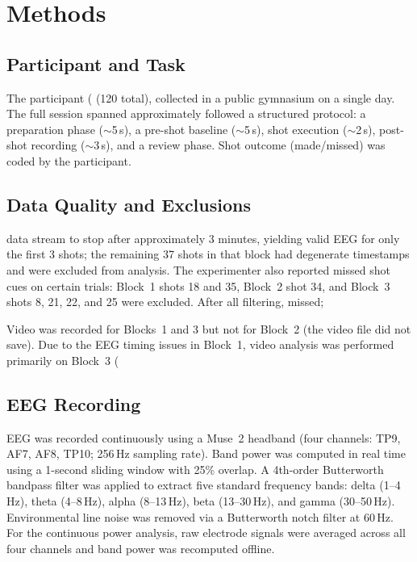 \documentclass[11pt,a4paper]{article}
\begin{document}
\section{Methods}

\subsection{Participant and Task}
The participant (%
(120 total), collected in a public gymnasium on a single day. The full session
spanned approximately %
followed a structured protocol: a preparation phase ($\sim$5\,s), a pre-shot
baseline ($\sim$5\,s), shot execution ($\sim$2\,s), post-shot recording
($\sim$3\,s), and a review phase. Shot outcome (made/missed) was coded by the
participant.

\subsection{Data Quality and Exclusions}
data stream to stop after approximately 3 minutes, yielding valid EEG for only
the first 3 shots; the remaining 37 shots in that block had degenerate
timestamps and were excluded from analysis. The experimenter also reported
missed shot cues on certain trials: Block~1 shots 18 and 35, Block~2 shot 34,
and Block~3 shots 8, 21, 22, and 25 were excluded. After all filtering,
missed; %

Video was recorded for Blocks~1 and 3 but not for Block~2 (the video file did
not save). Due to the EEG timing issues in Block~1, video analysis was
performed primarily on Block~3 (%

\subsection{EEG Recording}
EEG was recorded continuously using a Muse~2 headband (four channels: TP9,
AF7, AF8, TP10; 256\,Hz sampling rate). Band power was computed in real time
using a 1-second sliding window with 25\% overlap. A 4th-order Butterworth
bandpass filter was applied to extract five standard frequency bands: delta
(1--4\,Hz), theta (4--8\,Hz), alpha (8--13\,Hz), beta (13--30\,Hz), and gamma
(30--50\,Hz). Environmental line noise was removed via a Butterworth notch
filter at 60\,Hz. For the continuous power analysis, raw electrode signals were
averaged across all four channels and band power was recomputed offline.
\end{document}
